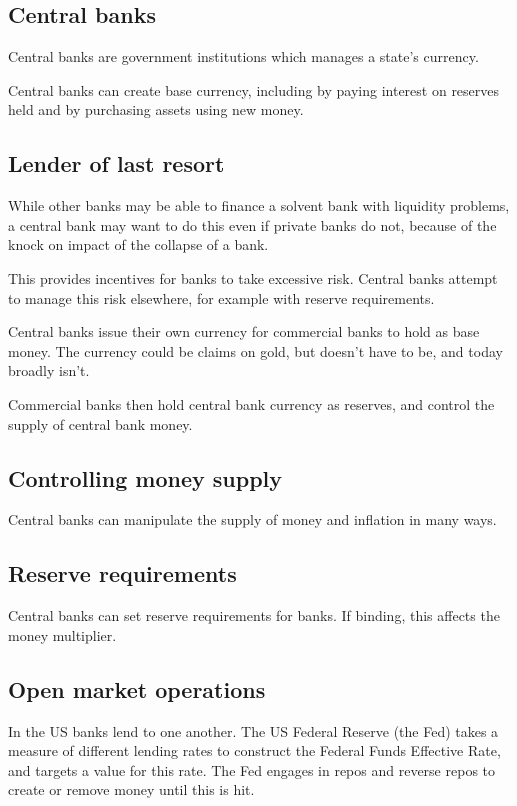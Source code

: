 
\subsection{Central banks}

Central banks are government institutions which manages a state’s currency.

Central banks can create base currency, including by paying interest on reserves held and by purchasing assets using new money.

\subsection{Lender of last resort}

While other banks may be able to finance a solvent bank with liquidity problems, a central bank may want to do this even if private banks do not, because of the knock on impact of the collapse of a bank.

This provides incentives for banks to take excessive risk. Central banks attempt to manage this risk elsewhere, for example with reserve requirements.

Central banks issue their own currency for commercial banks to hold as base money. The currency could be claims on gold, but doesn’t have to be, and today broadly isn’t.

Commercial banks then hold central bank currency as reserves, and control the supply of central bank money.

\subsection{Controlling money supply}

Central banks can manipulate the supply of money and inflation in many ways.

\subsection{Reserve requirements}

Central banks can set reserve requirements for banks. If binding, this affects the money multiplier.

\subsection{Open market operations}

In the US banks lend to one another. The US Federal Reserve (the Fed) takes a measure of different lending rates to construct the Federal Funds Effective Rate, and targets a value for this rate. The Fed engages in repos and reverse repos to create or remove money until this is hit.

